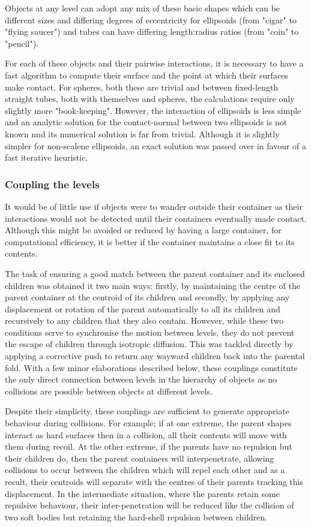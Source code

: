 Objects at any level can adopt any mix of these basic shapes which can be different 
sizes and differing degrees of eccentricity for ellipsoids (from "cigar" to "flying 
saucer") and tubes can have differing length:radius ratios (from "coin" to "pencil").

For each of these objects and their pairwise interactions, it is necessary to have 
a fast algorithm to compute their surface and the point at which their surfaces
make contact.   For spheres, both these are trivial and between fixed-length straight
tubes, both with themselves and spheres, the calculations require only slightly more
"book-keeping".    However, the interaction of ellipsoids is less simple and an analytic
solution for the contact-normal between two ellipsoids is not known nnd its numerical
solution is far from trivial.    Although it is slightly simpler for non-scalene ellipsoids,
an exact solution was passed over in favour of a fast iterative heuristic.  

\subsubsection{Coupling the levels}

It would be of little use if objects were to wander outside their container as their
interactions would not be detected until their containers eventually made contact.
Although this might be avoided or reduced by having a large container, for computational
efficiency, it is better if the container maintains a close fit to its contents.

The task of ensuring a good match between the parent container and its enclosed
children was obtained it two main ways: firstly, by maintaining the centre of the
parent container at the centroid of its children and secondly, by applying any
displacement or rotation of the parent automatically to all its children and recursively
to any children that they also contain.   However, while these two conditions serve
to synchronise the motion between levels, they do not prevent the escape of children
through isotropic diffusion.   This was tackled directly by applying a corrective push
to return any wayward children back into the parental fold.   With a few minor elaborations
described below, these couplings constitute the only direct connection between levels in the
hierarchy of objects as no collisions are possible between objects at different levels.

Despite their simplicity, these couplings are sufficient to generate appropriate
behaviour during collisions.   For example; if at one extreme, the parent shapes interact
as hard surfaces then in a collision, all their contents will move with them during
recoil.   At the other extreme, if the parents have no repulsion but their children do,
then the parent containers will interpenetrate, allowing collisions to occur between
the children which will repel each other and as a result, their centroids will 
separate with the centres of their parents tracking this displacement.   In the intermediate
situation, where the parents retain some repulsive behaviour, their inter-penetration
will be reduced like the collision of two soft bodies but retaining the hard-shell
repulsion between children.   


